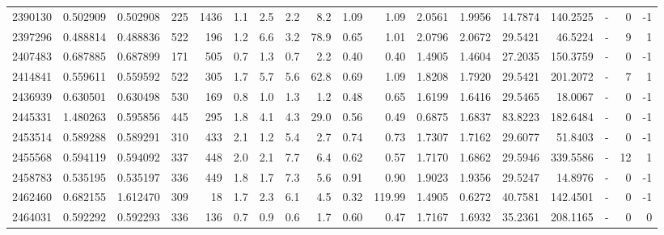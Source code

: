 \begin{tabular}{rrrrrrrrrrrrrrrlrr}
   2390130 & 0.502909 &   0.502908 &  225 & 1436 &      1.1 &      2.5 &     2.2 &      8.2 &       1.09 &        1.09 &  2.0561 &  1.9956 &   14.7874 &  140.2525 &             - &        0 &         -1 \\
   2397296 & 0.488814 &   0.488836 &  522 &  196 &      1.2 &      6.6 &     3.2 &     78.9 &       0.65 &        1.01 &  2.0796 &  2.0672 &   29.5421 &   46.5224 &             - &        9 &          1 \\
   2407483 & 0.687885 &   0.687899 &  171 &  505 &      0.7 &      1.3 &     0.7 &      2.2 &       0.40 &        0.40 &  1.4905 &  1.4604 &   27.2035 &  150.3759 &             - &        0 &         -1 \\
   2414841 & 0.559611 &   0.559592 &  522 &  305 &      1.7 &      5.7 &     5.6 &     62.8 &       0.69 &        1.09 &  1.8208 &  1.7920 &   29.5421 &  201.2072 &             - &        7 &          1 \\
   2436939 & 0.630501 &   0.630498 &  530 &  169 &      0.8 &      1.0 &     1.3 &      1.2 &       0.48 &        0.65 &  1.6199 &  1.6416 &   29.5465 &   18.0067 &             - &        0 &         -1 \\
   2445331 & 1.480263 &   0.595856 &  445 &  295 &      1.8 &      4.1 &     4.3 &     29.0 &       0.56 &        0.49 &  0.6875 &  1.6837 &   83.8223 &  182.6484 &             - &        0 &         -1 \\
   2453514 & 0.589288 &   0.589291 &  310 &  433 &      2.1 &      1.2 &     5.4 &      2.7 &       0.74 &        0.73 &  1.7307 &  1.7162 &   29.6077 &   51.8403 &             - &        0 &         -1 \\
   2455568 & 0.594119 &   0.594092 &  337 &  448 &      2.0 &      2.1 &     7.7 &      6.4 &       0.62 &        0.57 &  1.7170 &  1.6862 &   29.5946 &  339.5586 &             - &       12 &          1 \\
   2458783 & 0.535195 &   0.535197 &  336 &  449 &      1.8 &      1.7 &     7.3 &      5.6 &       0.91 &        0.90 &  1.9023 &  1.9356 &   29.5247 &   14.8976 &             - &        0 &         -1 \\
   2462460 & 0.682155 &   1.612470 &  309 &   18 &      1.7 &      2.3 &     6.1 &      4.5 &       0.32 &      119.99 &  1.4905 &  0.6272 &   40.7581 &  142.4501 &             - &        0 &         -1 \\
   2464031 & 0.592292 &   0.592293 &  336 &  136 &      0.7 &      0.9 &     0.6 &      1.7 &       0.60 &        0.47 &  1.7167 &  1.6932 &   35.2361 &  208.1165 &             - &        0 &          0 \\

\end{tabular}
